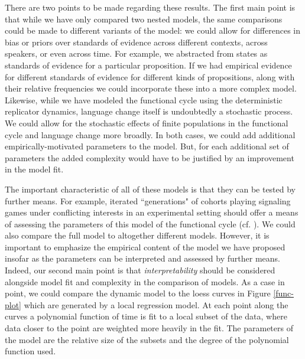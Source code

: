 \documentclass[linguex]{sp}
\theoremstyle{definition} \newtheorem{definition}{Definition}
\begin{document}
There are two points to be made regarding these results. The first main point is that while we have only compared two nested models, the same comparisons could be made to different variants of the model: we could allow for differences in bias or priors over standards of evidence across different contexts, across speakers, or even across time. For example, we abstracted from states as standards of evidence for a particular proposition. If we had empirical evidence for different standards of evidence for different kinds of propositions, along with their relative frequencies we could incorporate these into a more complex model. Likewise, while we have modeled the functional cycle using the deterministic replicator dynamics, language change itself is undoubtedly a stochastic process.  We could allow for the stochastic effects of finite populations \citep{moran1958,kimura1968} in the functional cycle and language  change more broadly. In both cases, we could add additional empirically-motivated parameters to the model. But, for each additional set of parameters the added complexity would have to be justified by an improvement in the model fit. 

The important characteristic of all of these models is that they can be tested by further means. For example, iterated ``generations" of cohorts playing signaling games under conflicting interests in an experimental setting should offer a means of assessing the parameters of this model of the functional cycle  (cf. \citealt{blume-etal:2001,mesoudi2008multiple}).  We could also compare the full model to altogether different models. However, it is important to emphasize the empirical content of the model we have proposed insofar as the parameters can be interpreted and assessed by further means.  Indeed, our second main point is that \emph{interpretability} should be considered alongside model fit and complexity in the comparison of models. As a case in point, we could compare the dynamic model to the loess curves in Figure \ref{func-plot} which are generated by a local regression model. At each point along the curves a polynomial function of time is fit to a local subset of the data, where data closer to the point are weighted more heavily in the fit. The parameters of the model are the relative size of the subsets and the degree of the polynomial function used. 
\end{document}
